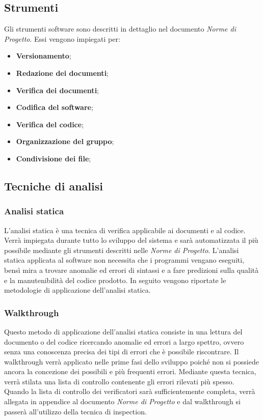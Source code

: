 \subsection{Strumenti}
Gli strumenti software sono descritti in dettaglio nel documento \textit{Norme di Progetto}. Essi vengono impiegati per:
\begin{itemize}
\item \textbf{Versionamento};
\item \textbf{Redazione dei documenti};
\item \textbf{Verifica dei documenti};
\item \textbf{Codifica del software};
\item \textbf{Verifica del codice};
\item \textbf{Organizzazione del gruppo};
\item \textbf{Condivisione dei file};
\end{itemize}


\subsection{Tecniche di analisi}

\subsubsection{Analisi statica}
L’analisi statica è una tecnica di verifica applicabile ai documenti e al codice. Verrà impiegata durante tutto lo sviluppo del sistema e sarà automatizzata il più possibile mediante gli strumenti descritti nelle \textit{Norme di Progetto}. L’analisi statica applicata al software non necessita che i programmi vengano eseguiti, bensì mira a trovare anomalie ed errori di sintassi e a fare predizioni sulla qualità e la manutenibilità del codice prodotto. In seguito vengono riportate le metodologie di applicazione dell’analisi statica.

\subsubsection{Walkthrough}
Questo metodo di applicazione dell’analisi statica consiste in una lettura del documento o del codice ricercando anomalie ed errori a largo spettro, ovvero senza una conoscenza precisa dei tipi di errori che è possibile riscontrare. Il walkthrough verrà applicato nelle prime fasi dello sviluppo poiché non si possiede ancora la concezione dei possibili e più frequenti errori. Mediante questa tecnica, verrà stilata una lista di controllo contenente gli errori rilevati più spesso. Quando la lista di controllo dei verificatori sarà sufficientemente completa, verrà allegata in appendice al documento \textit{Norme di Progetto} e dal walkthrough si passerà all’utilizzo della tecnica di inspection.


